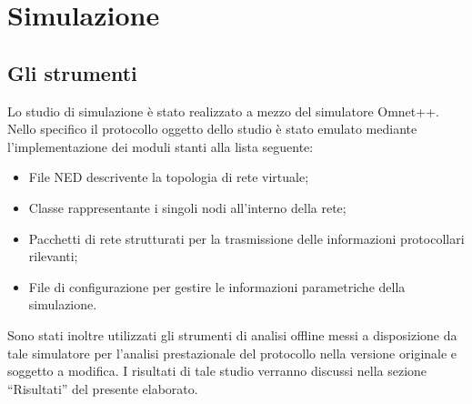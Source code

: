 \documentclass[	
	DIV=calc,
	paper=a4,
	fontsize=11pt,
	onecolumn
]{scrartcl} %
\begin{document}
\section{Simulazione}
	\subsection{Gli strumenti}
	Lo studio di simulazione è stato realizzato a mezzo del simulatore Omnet++. Nello specifico il protocollo oggetto dello studio è stato emulato mediante l'implementazione dei moduli stanti alla lista seguente:
	\begin{itemize}
		\item File NED descrivente la topologia di rete virtuale;
		\item Classe rappresentante i singoli nodi all'interno della rete;
		\item Pacchetti di rete strutturati per la trasmissione delle informazioni protocollari rilevanti;
		\item File di configurazione per gestire le informazioni parametriche della simulazione.
	\end{itemize}
	Sono stati inoltre utilizzati gli strumenti di analisi offline messi a disposizione da tale simulatore per l'analisi prestazionale del protocollo nella versione originale e soggetto a modifica. I risultati di tale studio verranno discussi nella sezione ``Risultati'' del presente elaborato.
\end{document}
